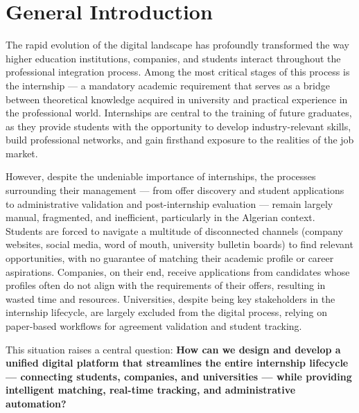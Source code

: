 
\chapter*{General Introduction}

\vspace{0.5cm}

The rapid evolution of the digital landscape has profoundly transformed the way higher education institutions, companies, and students interact throughout the professional integration process. Among the most critical stages of this process is the internship --- a mandatory academic requirement that serves as a bridge between theoretical knowledge acquired in university and practical experience in the professional world. Internships are central to the training of future graduates, as they provide students with the opportunity to develop industry-relevant skills, build professional networks, and gain firsthand exposure to the realities of the job market.

However, despite the undeniable importance of internships, the processes surrounding their management --- from offer discovery and student applications to administrative validation and post-internship evaluation --- remain largely manual, fragmented, and inefficient, particularly in the Algerian context. Students are forced to navigate a multitude of disconnected channels (company websites, social media, word of mouth, university bulletin boards) to find relevant opportunities, with no guarantee of matching their academic profile or career aspirations. Companies, on their end, receive applications from candidates whose profiles often do not align with the requirements of their offers, resulting in wasted time and resources. Universities, despite being key stakeholders in the internship lifecycle, are largely excluded from the digital process, relying on paper-based workflows for agreement validation and student tracking.

This situation raises a central question: \textbf{How can we design and develop a unified digital platform that streamlines the entire internship lifecycle --- connecting students, companies, and universities --- while providing intelligent matching, real-time tracking, and administrative automation?}

